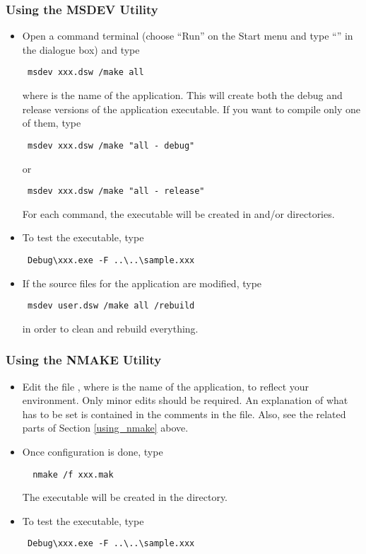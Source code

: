 \subsubsection{Using the MSDEV Utility}
\begin{itemize}
\item Open a command terminal (choose ``Run'' on the Start menu and type
``'' in the dialogue box) and type
{\color{Brown}
\begin{verbatim}
 msdev xxx.dsw /make all
\end{verbatim}
} where  is the name of the application. This will create both the
debug and release versions of the application executable. If you want to
compile only one of them, type 
{\color{Brown}
\begin{verbatim}
 msdev xxx.dsw /make "all - debug"
\end{verbatim}
}
or 
{\color{Brown}
\begin{verbatim}
 msdev xxx.dsw /make "all - release"
\end{verbatim}
}
For each command, the executable  will be created in 
 and/or 
directories. 

\item To test the executable, type 
{\color{Brown}
\begin{verbatim}
 Debug\xxx.exe -F ..\..\sample.xxx
\end{verbatim}
}
\item If the source files for the application are modified, type 
{\color{Brown}
\begin{verbatim}
 msdev user.dsw /make all /rebuild
\end{verbatim}
}
in order to clean and rebuild everything.
\end{itemize} 

\subsubsection{Using the NMAKE Utility}

\begin{itemize}
\item 
Edit the file , where  is the name of the application,
to reflect your environment. Only minor edits should be required. An
explanation of what has to be set is contained in the comments in the
 file. Also, see the related parts of Section \ref{using_nmake}
above.

\item Once configuration is done, type 
{\color{Brown}
\begin{verbatim}
  nmake /f xxx.mak
\end{verbatim}
}
The executable  will be created in the  directory.
\item To test the executable, type 
{\color{Brown}
\begin{verbatim}
 Debug\xxx.exe -F ..\..\sample.xxx
\end{verbatim}
}
\end{itemize}

